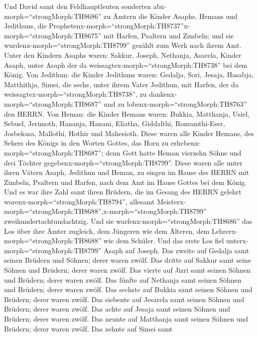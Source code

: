  Und David samt den Feldhauptleuten sonderten
abx-morph=``strongMorph:TH8686'' zu Ämtern die Kinder Asaphs, Hemans und
Jedithuns, die
Prophetenx-morph=``strongMorph:TH8737''\textbar x-morph=``strongMorph:TH8675''
mit Harfen, Psaltern und Zimbeln; und sie
wurdenx-morph=``strongMorph:TH8799'' gezählt zum Werk nach ihrem Amt.
 Unter den Kindern Asaphs waren: Sakkur, Joseph, Nethanja,
Asarela, Kinder Asaph, unter Asaph der da
weissagtex-morph=``strongMorph:TH8738'' bei dem König.  Von
Jedithun: die Kinder Jedithuns waren: Gedalja, Sori, Jesaja, Hasabja,
Matthithja, Simei, die sechs, unter ihrem Vater Jedithun, mit Harfen,
der da weissagtex-morph=``strongMorph:TH8738'', zu
dankenx-morph=``strongMorph:TH8687'' und zu
lobenx-morph=``strongMorph:TH8763'' den HERRN.  Von Heman:
die Kinder Hemans waren: Bukkia, Matthanja, Usiel, Sebuel, Jerimoth,
Hananja, Hanani, Eliatha, Giddalthi, Romamthi-Eser, Josbekasa, Mallothi,
Hothir und Mahesioth.  Diese waren alle Kinder Hemans, des
Sehers des Königs in den Worten Gottes, das Horn zu
erhebenx-morph=``strongMorph:TH8687''; denn Gott hatte Heman vierzehn
Söhne und drei Töchter gegebenx-morph=``strongMorph:TH8799''.
 Diese waren alle unter ihren Vätern Asaph, Jedithun und
Heman, zu singen im Hause des HERRN mit Zimbeln, Psaltern und Harfen,
nach dem Amt im Hause Gottes bei dem König.  Und es war ihre
Zahl samt ihren Brüdern, die im Gesang des HERRN gelehrt
warenx-morph=``strongMorph:TH8794'', allesamt
Meisterx-morph=``strongMorph:TH8688'',x-morph=``strongMorph:TH8799''
zweihundertachtundachtzig.  Und sie
warfenx-morph=``strongMorph:TH8686'' das Los über ihre Ämter zugleich,
dem Jüngeren wie dem Älteren, dem Lehrerx-morph=``strongMorph:TH8688''
wie dem Schüler.  Und das erste Los fiel
unterx-morph=``strongMorph:TH8799'' Asaph auf Joseph. Das zweite auf
Gedalja samt seinen Brüdern und Söhnen; derer waren zwölf. 
Das dritte auf Sakkur samt seine Söhnen und Brüdern; derer waren zwölf.
 Das vierte auf Jizri samt seinen Söhnen und Brüdern; derer
waren zwölf.  Das fünfte auf Nethanja samt seinen Söhnen
und Brüdern; derer waren zwölf.  Das sechste auf Bukkia
samt seinen Söhnen und Brüdern; derer waren zwölf.  Das
siebente auf Jesarela samt seinen Söhnen und Brüdern; derer waren zwölf.
 Das achte auf Jesaja samt seinen Söhnen und Brüdern; derer
waren zwölf.  Das neunte auf Matthanja samt seinen Söhnen
und Brüdern; derer waren zwölf.  Das zehnte auf Simei samt
